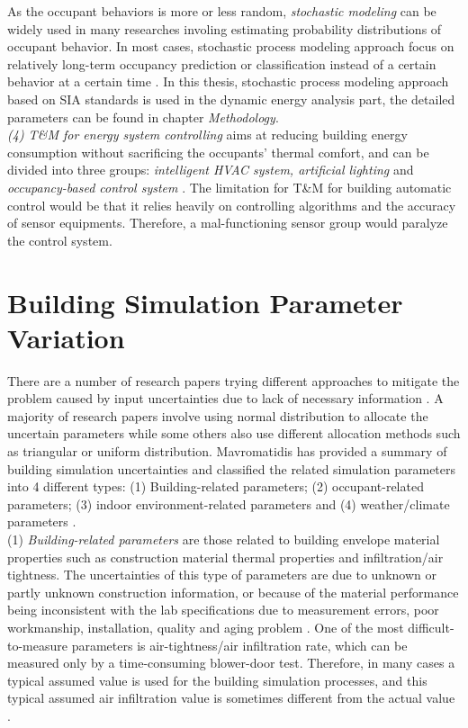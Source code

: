 \documentclass[a4paper, oneside]{discothesis}
\begin{document}
			As the occupant behaviors is more or less random, \textit{stochastic modeling} can be widely used in many researches involing estimating probability distributions of occupant behavior. In most cases, stochastic process modeling approach focus on relatively long-term occupancy prediction or classification instead of a certain behavior at a certain time \cite{ZOU2018165}.
			In this thesis, stochastic process modeling approach based on SIA standards is used in the dynamic energy analysis part, the detailed parameters can be found in chapter \textit{Methodology}.\\

			\textit{(4) T\&M for energy system controlling} aims at reducing building energy consumption without sacrificing the occupants' thermal comfort, and can be divided into three groups: \textit{intelligent HVAC system, artificial lighting} and \textit{occupancy-based control system} \cite{ZOU2018165,hong2015review}. The limitation for T\&M for building automatic control would be that it relies heavily on controlling algorithms and the accuracy of sensor equipments. Therefore, a mal-functioning sensor group would paralyze the control system.

	\section{Building Simulation Parameter Variation}
		There are a number of research papers trying different approaches to mitigate the problem caused by input uncertainties due to lack of necessary information \cite{GeorgeThesis}. A majority of research papers involve using normal distribution to allocate the uncertain parameters while some others also use different allocation methods such as triangular or uniform distribution. Mavromatidis \cite{GeorgeThesis} has provided a summary of building simulation uncertainties and classified the related simulation parameters into 4 different types: (1) Building-related parameters; (2) occupant-related parameters; (3) indoor environment-related parameters and (4) weather/climate parameters \cite{GeorgeThesis}.\\

		(1) \textit{Building-related parameters} are those related to building envelope material properties such as construction material thermal properties and infiltration/air tightness. The uncertainties of this type of parameters are due to unknown or partly unknown construction information, or because of the material performance being inconsistent with the lab specifications due to measurement errors, poor workmanship, installation, quality and aging problem \cite{GeorgeThesis}. One of the most difficult-to-measure parameters is air-tightness/air infiltration rate, which can be measured only by a time-consuming blower-door test. Therefore, in many cases a typical assumed value is used for the building simulation processes, and this typical assumed air infiltration value is sometimes different from the actual value \cite{GeorgeThesis,burhenne2013uncertainty}.\\
\end{document}

